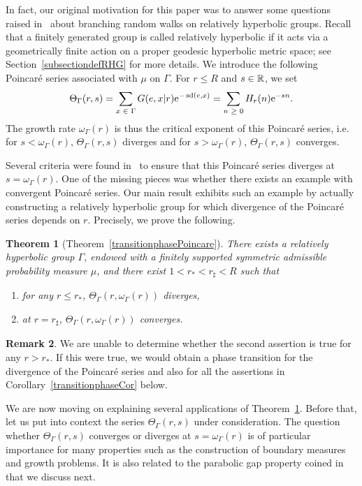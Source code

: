 \documentclass[10pt]{amsart}
\newtheorem{theo}{Theorem}[section]
\theoremstyle{definition}\newtheorem{defi}[theo]{Definition}\newtheorem{rema}[theo]{Remark}\newtheorem{exam}[theo]{Example}\newtheorem{exem}[theo]{Example}\newtheorem{nota}[theo]{Notation}
\newcommand{\R}{\mathbb{R}}
\newcommand{\rme}{\mathrm{e}}
\DeclareMathOperator{\sd}{sd}
\let\oldin\in
\renewcommand{\in}{\mathchoice{\oldin}{\oldin}{\,\oldin\,}{\,\oldin\,}}
\let\oldge\ge
\renewcommand{\ge}{\mathchoice{\oldge}{\oldge}{\,\oldge\,}{\,\oldge\,}}
\begin{document}
In fact, our original motivation for this paper was to answer some questions raised in~\cite{DWY} about branching random walks on relatively hyperbolic groups. Recall that a finitely generated group is called relatively hyperbolic if it acts via a geometrically finite action on a proper geodesic hyperbolic metric space; see Section~\ref{subsectiondefRHG} for more details. We introduce the following Poincaré series associated with $\mu$ on $\Gamma$. For $r\leq R$ and $s\in \R$, we set
\begin{align}\label{PoincareSeriesEQ}
\Theta_\Gamma(r,s)=\sum_{x\in \Gamma}G(e,x|r)\rme^{-\sd(e,x)}=\sum_{n\ge 0}H_r(n)\rme^{-sn}.
\end{align}
The growth rate $\omega_\Gamma(r)$ is thus the critical exponent of this Poincaré series, i.e. for $s<\omega_\Gamma(r)$, $\Theta_\Gamma(r,s)$ diverges and for $s>\omega_\Gamma(r)$, $\Theta_\Gamma(r,s)$ converges.

Several criteria were found in~\cite{DWY} to ensure that this Poincaré series diverges at $s=\omega_\Gamma(r)$. One of the missing pieces was whether there exists an example with convergent Poincaré series. Our main result exhibits such an example by actually constructing a relatively hyperbolic group for which divergence of the Poincaré series depends on $r$. Precisely, we prove the following.


\begin{theo}[{Theorem~\ref{transitionphasePoincare}}]\label{mainthm}
There exists a relatively hyperbolic group $\Gamma$, endowed with a finitely supported symmetric admissible probability measure $\mu$, and there exist $1<r_*<r_\sharp<R$ such that
\begin{enumerate}
\item\label{theo1.1.1} for any $r\leq r_*$, $\Theta_\Gamma(r,\omega_\Gamma(r))$ diverges,
\item\label{theo1.1.2} at $r=r_\sharp$, $\Theta_\Gamma(r,\omega_\Gamma(r))$ converges.
\end{enumerate}
\end{theo}


\begin{rema}
We are unable to determine whether the second assertion is true for any $r>r_*$. If this were true, we would obtain a phase transition for the divergence of the Poincaré series and also for all the assertions in Corollary~\ref{transitionphaseCor} below.
\end{rema}

We are now moving on explaining several applications of Theorem~\ref{mainthm}. Before that, let us put into context the series $\Theta_\Gamma(r,s)$ under consideration. The question whether $\Theta_\Gamma(r,s)$ converges or diverges at $s=\omega_\Gamma(r)$ is of particular importance for many properties such as the construction of boundary measures and growth problems. It is also related to the parabolic gap property coined in~\cite{DWY} that we discuss next.
\end{document}
